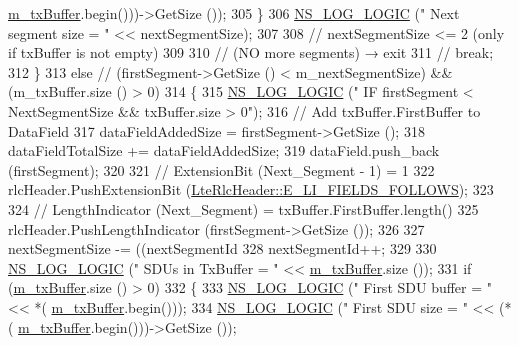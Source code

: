 \begin{DoxyCode}
      \hyperlink{classns3_1_1LteRlcUm_ac2c10aa57585dbea3797d651f3dce7be}{m\_txBuffer}.begin()))->GetSize ());
305             \}
306           \hyperlink{group__logging_ga88acd260151caf2db9c0fc84997f45ce}{NS\_LOG\_LOGIC} (\textcolor{stringliteral}{"        Next segment size = "} << nextSegmentSize);
307 
308           \textcolor{comment}{// nextSegmentSize <= 2 (only if txBuffer is not empty)}
309 
310           \textcolor{comment}{// (NO more segments) → exit}
311           \textcolor{comment}{// break;}
312         \}
313       \textcolor{keywordflow}{else} \textcolor{comment}{// (firstSegment->GetSize () < m\_nextSegmentSize) && (m\_txBuffer.size () > 0)}
314         \{
315           \hyperlink{group__logging_ga88acd260151caf2db9c0fc84997f45ce}{NS\_LOG\_LOGIC} (\textcolor{stringliteral}{"    IF firstSegment < NextSegmentSize && txBuffer.size > 0"});
316           \textcolor{comment}{// Add txBuffer.FirstBuffer to DataField}
317           dataFieldAddedSize = firstSegment->GetSize ();
318           dataFieldTotalSize += dataFieldAddedSize;
319           dataField.push\_back (firstSegment);
320 
321           \textcolor{comment}{// ExtensionBit (Next\_Segment - 1) = 1}
322           rlcHeader.PushExtensionBit (\hyperlink{classns3_1_1LteRlcHeader_a48248337dcddd6c1f6f79b75b898266aac938d14a69d34c1fbea6822591cfe9de}{LteRlcHeader::E\_LI\_FIELDS\_FOLLOWS});
323 
324           \textcolor{comment}{// LengthIndicator (Next\_Segment)  = txBuffer.FirstBuffer.length()}
325           rlcHeader.PushLengthIndicator (firstSegment->GetSize ());
326 
327           nextSegmentSize -= ((nextSegmentId %
328           nextSegmentId++;
329 
330           \hyperlink{group__logging_ga88acd260151caf2db9c0fc84997f45ce}{NS\_LOG\_LOGIC} (\textcolor{stringliteral}{"        SDUs in TxBuffer  = "} << \hyperlink{classns3_1_1LteRlcUm_ac2c10aa57585dbea3797d651f3dce7be}{m\_txBuffer}.size ());
331           \textcolor{keywordflow}{if} (\hyperlink{classns3_1_1LteRlcUm_ac2c10aa57585dbea3797d651f3dce7be}{m\_txBuffer}.size () > 0)
332             \{
333               \hyperlink{group__logging_ga88acd260151caf2db9c0fc84997f45ce}{NS\_LOG\_LOGIC} (\textcolor{stringliteral}{"        First SDU buffer  = "} << *(
      \hyperlink{classns3_1_1LteRlcUm_ac2c10aa57585dbea3797d651f3dce7be}{m\_txBuffer}.begin()));
334               \hyperlink{group__logging_ga88acd260151caf2db9c0fc84997f45ce}{NS\_LOG\_LOGIC} (\textcolor{stringliteral}{"        First SDU size    = "} << (*(
      \hyperlink{classns3_1_1LteRlcUm_ac2c10aa57585dbea3797d651f3dce7be}{m\_txBuffer}.begin()))->GetSize ());

\end{DoxyCode}
